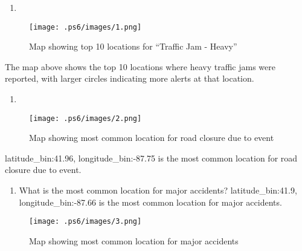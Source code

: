 \documentclass[
  letterpaper,
  DIV=11,
  numbers=noendperiod]{scrartcl}
\providecommand{\tightlist}{%
  \setlength{\itemsep}{0pt}\setlength{\parskip}{0pt}}\usepackage{longtable,booktabs,array}
\begin{document}
\begin{enumerate}
\def\labelenumi{\alph{enumi}.}
\setcounter{enumi}{1}
\tightlist
\item
\end{enumerate}

\begin{figure}[H]

{\centering \texttt{[image: .ps6/images/1.png]}

}

\caption{Map showing top 10 locations for ``Traffic Jam - Heavy''}

\end{figure}%

The map above shows the top 10 locations where heavy traffic jams were
reported, with larger circles indicating more alerts at that location.

\begin{enumerate}
\def\labelenumi{\alph{enumi}.}
\setcounter{enumi}{2}
\tightlist
\item
\end{enumerate}

\begin{figure}[H]

{\centering \texttt{[image: .ps6/images/2.png]}

}

\caption{Map showing most common location for road closure due to event}

\end{figure}%

latitude\_bin:41.96, longitude\_bin:-87.75 is the most common location
for road closure due to event.

\begin{enumerate}
\def\labelenumi{\alph{enumi}.}
\setcounter{enumi}{3}
\tightlist
\item
  What is the most common location for major accidents?
  latitude\_bin:41.9, longitude\_bin:-87.66 is the most common location
  for major accidents.
\end{enumerate}

\begin{figure}[H]

{\centering \texttt{[image: .ps6/images/3.png]}

}

\caption{Map showing most common location for major accidents}

\end{figure}%
\end{document}
